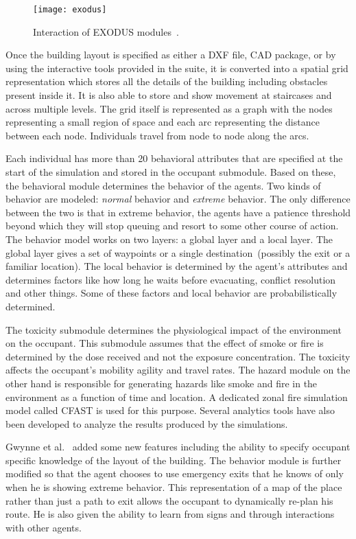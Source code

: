 \begin{figure}[!htb]
\centering
\texttt{[image: exodus]}
\caption[EXODUS model]{Interaction of EXODUS modules~\cite{Gwynne:2001te}.}
\label{fig:ExodusDiagram}
\end{figure}


Once the building layout is specified as either a DXF file, CAD package, or by using the interactive tools provided in the suite, it is converted into a spatial grid representation which stores all the details of the building including obstacles present inside it. It is also able to store and show movement at staircases and across multiple levels. The grid itself is represented as a graph with the nodes representing a small region of space and each arc representing the distance between each node. Individuals travel from node to node along the arcs.

Each individual has more than 20 behavioral attributes that are specified at the start of the simulation and stored in the occupant submodule. Based on these, the behavioral module determines the behavior of the agents. Two kinds of behavior are modeled: \emph{normal} behavior and \emph{extreme} behavior. The only difference between the two is that in extreme behavior, the agents have a patience threshold beyond which they will stop queuing and resort to some other course of action. The behavior model works on two layers: a global layer and a local layer. The global layer gives a set of waypoints or a single destination~(possibly the exit or a familiar location). The local behavior is determined by the agent's attributes and determines factors like how long he waits before evacuating, conflict resolution and other things. Some of these factors and local behavior are probabilistically determined.

The toxicity submodule determines the physiological impact of the environment on the occupant. This submodule assumes that the effect of smoke or fire is determined by the dose received and not the exposure concentration. The toxicity affects the occupant's mobility agility and travel rates. The hazard module on the other hand is responsible for generating hazards like smoke and fire in the environment as a function of time and location. A dedicated zonal fire simulation model called CFAST is used for this purpose. Several analytics tools have also been developed to analyze the results produced by the simulations.

Gwynne et al.~\cite{Gwynne:2001te} added some new features including the ability to specify occupant specific knowledge of the layout of the building. The behavior module is further modified so that the agent chooses to use emergency exits that he knows of only when he is showing extreme behavior. This representation of a map of the place rather than just a path to exit allows the occupant to dynamically re-plan his route. He is also given the ability to learn from signs and through interactions with other agents.

